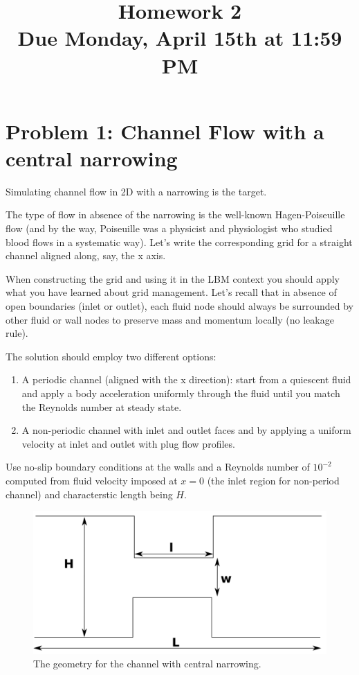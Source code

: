 \documentclass[11pt]{article}
\title{Homework 2 \\[1.0em] \normalsize Due Monday, April 15th at 11:59 PM}
\date{}
\begin{document}
  \maketitle

  \section{Problem 1:  Channel Flow with a central narrowing}

Simulating channel flow in 2D with a narrowing is the target.

The type of flow in absence of the narrowing is the well-known Hagen-Poiseuille flow 
(and by the way, Poiseuille was a physicist and physiologist who studied blood flows 
in a systematic way). Let's write the corresponding grid for a straight channel aligned along, say, the x axis. 

When constructing the grid and using it in the LBM context 
you should apply what you have learned about grid management. Let's recall that in absence of open boundaries (inlet or outlet), each fluid node should always 
be surrounded by other fluid or wall nodes to preserve mass and momentum locally (no leakage rule).

The solution should employ two different options:

    \begin{enumerate}
      \item A periodic channel (aligned with the x direction): start from a quiescent fluid and
      apply a body acceleration uniformly through the fluid until you match the Reynolds number at steady state.
      \item A non-periodic channel with inlet and outlet faces and by applying a uniform velocity 
      at inlet and outlet with plug flow profiles.
    \end{enumerate}

    Use no-slip boundary conditions at the walls and a Reynolds number of $10^{-2}$ computed from fluid velocity 
    imposed at $x=0$ (the inlet region for non-period channel) and characterstic length being $H$.

    \begin{figure}[h!]
      \centering{}\includegraphics[scale=0.6]{narrowing}
      \caption{The geometry for the channel with central narrowing.}
      \label{fig:narrowing}
    \end{figure}
\end{document}
